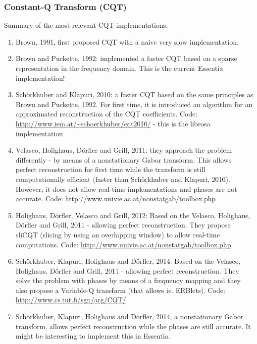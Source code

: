 \documentclass[report.tex]{subfiles}
\begin{document}
\subsubsection{Constant-Q Transform (CQT)}

Summary of the most relevant CQT implementations:

\begin{enumerate}
	\item
	    Brown, 1991, first proposed CQT with a naive very slow implementation.
    \item
	    Brown and Puckette, 1992: implemented a faster CQT based on a sparse representation in the frequency domain. This is the current Essentia implementation!
    \item
	    Sch{\"o}rkhuber and Klapuri, 2010: a faster CQT based on the same principles as Brown and Puckette, 1992. For first time, it is introduced an algorithm for an approximated reconstruction of the CQT coefficients. Code: \url{http://www.iem.at/~schoerkhuber/cqt2010/} - this is the librosa implementation
    \item
	    Velasco, Holighaus, D{\"o}rfler and Grill, 2011: they approach the problem differently - by means of a nonstationary Gabor transform. This allows perfect reconstruction for first time while the transform is still computationally efficient (faster than Sch{\"o}rkhuber and Klapuri, 2010). However, it does not allow real-time implementations and phases are not accurate. Code: \url{http://www.univie.ac.at/nonstatgab/toolbox.php}
    \item
	    Holighaus, D{\"o}rfler, Velasco and Grill, 2012: Based on the Velasco, Holighaus, Dörfler and Grill, 2011 - allowing perfect reconstruction. They propose sliCQT (slicing by using an overlapping window) to allow real-time computations. Code: \url{http://www.univie.ac.at/nonstatgab/toolbox.php}
    \item
	    Sch{\"o}rkhuber, Klapuri, Holighaus and Dörfler, 2014: Based on the Velasco, Holighaus, Dörfler and Grill, 2011 - allowing perfect reconstruction. They solve the problem with phases by means of a frequency mapping and they also propose a Variable-Q transform (that allows ie. ERBlets). Code: \url{http://www.cs.tut.fi/sgn/arg/CQT/}
    \item
	    Sch{\"o}rkhuber, Klapuri, Holighaus and D{\"o}rfler, 2014, a nonstationary Gabor transform, allows perfect reconstruction while the phases are still accurate. It might be interesting to implement this in Essentia.
\end{enumerate}
\end{document}
